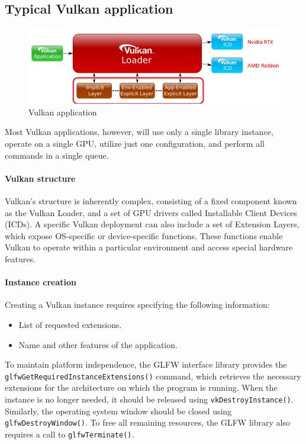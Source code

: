 \subsection{Typical Vulkan application}
\begin{figure}[H]
    \centering
    \includegraphics[width=0.4\linewidth]{images/vulkan1.png}
    \caption{Vulkan application}
\end{figure}
Most Vulkan applications, however, will use only a single library instance, operate on a single GPU, utilize just one configuration, and perform all commands in a single queue.

\paragraph*{Vulkan structure}
Vulkan's structure is inherently complex, consisting of a fixed component known as the Vulkan Loader, and a set of GPU drivers called Installable Client Devices (ICDs). 
A specific Vulkan deployment can also include a set of Extension Layers, which expose OS-specific or device-specific functions. 
These functions enable Vulkan to operate within a particular environment and access special hardware features.

\paragraph*{Instance creation}
Creating a Vulkan instance requires specifying the following information:
\begin{itemize}
    \item List of requested extensions.
    \item Name and other features of the application.
\end{itemize}
To maintain platform independence, the GLFW interface library provides the \texttt{glfwGetRequiredInstanceExtensions()} command, which retrieves the necessary extensions for the architecture on which the program is running.
When the instance is no longer needed, it should be released using \texttt{vkDestroyInstance()}. 
Similarly, the operating system window should be closed using \texttt{glfwDestroyWindow()}. 
To free all remaining resources, the GLFW library also requires a call to \texttt{glfwTerminate()}.

